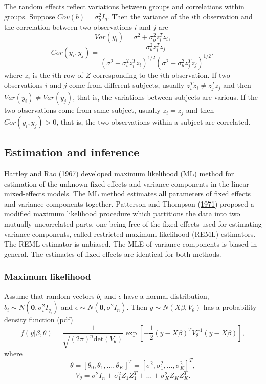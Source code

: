 \documentclass[
]{article}
\begin{document}
The random effects reflect variations between groups and correlations
within groups. Suppose \(Cov(b) = \sigma_b^2I_q\). Then the variance of
the \(i\)th observation and the correlation between two observations
\(i\) and \(j\) are \[Var(y_i) = \sigma^2 + \sigma_b^2z_i^Tz_i,\] \[
 Cor(y_i, y_j) = \frac{\sigma_b^2z_i^Tz_j}{(\sigma^2 + \sigma_b^2z_i^Tz_i)^{1/2}(\sigma^2 + \sigma_b^2z_j^Tz_j)^{1/2}},
\] where \(z_i\) is the \(i\)th row of \(Z\) corresponding to the
\(i\)th observation. If two observations \(i\) and \(j\) come from
different subjects, usually \(z_i^Tz_i \ne z_j^Tz_j\) and then
\(Var(y_i)\ne Var(y_j)\), that is, the variations between subjects are
various. If the two observations come from same subject, usually
\(z_i = z_j\) and then \(Cor(y_i, y_j)>0\), that is, the two
observations within a subject are correlated.

\hypertarget{estimation-and-inference}{%
\subsection{Estimation and inference}\label{estimation-and-inference}}

Hartley and Rao (\protect\hyperlink{ref-HartleyRao1967}{1967}) developed
maximum likelihood (ML) method for estimation of the unknown fixed
effects and variance components in the linear mixed-effects models. The
ML method estimates all parameters of fixed effects and variance
components together. Patterson and Thompson
(\protect\hyperlink{ref-PattersonThompson1971}{1971}) proposed a
modified maximum likelihood procedure which partitions the data into two
mutually uncorrelated parts, one being free of the fixed effects used
for estimating variance components, called restricted maximum likelihood
(REML) estimators. The REML estimator is unbiased. The MLE of variance
components is biased in general. The estimates of fixed effects are
identical for both methods.

\hypertarget{maximum-likelihood}{%
\subsubsection{Maximum likelihood}\label{maximum-likelihood}}

Assume that random vectors \(b_i\) and \(\epsilon\) have a normal
distribution, \(b_i \sim N(\mathbf{0}, \sigma^2_i I_{q_i})\) and
\(\epsilon \sim N(\mathbf{0}, \sigma^2I_n)\). Then
\(y \sim N(X\beta, V_{\theta})\) has a probability density function
(pdf)
\[f(y|\beta, \theta) = \frac{1}{\sqrt{(2\pi)^n\mathrm{det}(V_{\theta})}} \exp[-\frac{1}{2}(y-X\beta)^TV_{\theta}^{-1}(y-X\beta)],
\] where
\[\theta = [\theta_0, \theta_1, \ldots, \theta_K]^T = [\sigma^2,\sigma^2_1,\ldots,\sigma^2_K]^T,\]
\[V_{\theta} = \sigma^2 I_n + \sigma^2_1 Z_1Z_1^T + \ldots + \sigma^2_K Z_KZ_K^T.\]
\end{document}
